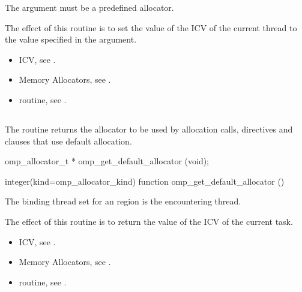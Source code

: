 \constraints

The  argument must be a predefined allocator.

\effect

The effect of this routine is to set the value of the  ICV of the current thread to the value specified in the  argument. 

\crossreferences

\begin{itemize}
\item {} ICV, see .
\item Memory Allocators, see .
\item {} routine, see .
\end{itemize}

\subsection{}
\label{subsec:omp_get_default_allocator}

\summary
The  routine returns the allocator to be used by allocation calls, directives and clauses that use default allocation.

\format
\ccppspecificstart
\begin{boxedcode}
omp_allocator_t * omp_get_default_allocator (void);
\end{boxedcode}
\ccppspecificend
\fortranspecificstart
\begin{boxedcode}
integer(kind=omp_allocator_kind) 
function omp_get_default_allocator ()
\end{boxedcode}
\fortranspecificend

\binding

The binding thread set for an  region is the encountering thread.

\effect

The effect of this routine is to return the value of the  ICV of the current task.

\crossreferences
\begin{itemize}
\item {} ICV, see .
\item Memory Allocators, see .
\item {} routine, see .
\end{itemize}

